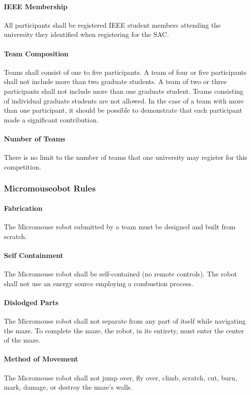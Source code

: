 \documentclass[12pt]{article}
\begin{document}
\paragraph{IEEE Membership}
All participants shall be registered IEEE student members attending the university they
identified when registering for the SAC.
\paragraph{Team Composition}
Teams shall consist of one to five participants. A team of four or five participants shall
not include more than two graduate students. A team of two or three participants shall
not include more than one graduate student. Teams consisting of individual graduate
students are not allowed. In the case of a team with more than one participant, it
should be possible to demonstrate that each participant made a significant contribution.
\paragraph{Number of Teams}
There is no limit to the number of teams that one university may register for this
competition.
\subsubsection{\texorpdfstring{\gls{Micromouse}} Robot Rules}
\paragraph{Fabrication}
The \gls{Micromouse} robot submitted by a team must be designed and built from scratch.
\paragraph{Self Containment}
The \gls{Micromouse} robot shall be self-contained (no remote controls). The robot shall not
use an energy source employing a combustion process.
\paragraph{Dislodged Parts}
The \gls{Micromouse} robot shall not separate from any part of itself while navigating the
\gls{maze}. To complete the \gls{maze}, the robot, in its entirety, must enter the center of the
\gls{maze}.
\paragraph{Method of Movement}
The \gls{Micromouse} robot shall not jump over, fly over, climb, scratch, cut, burn, mark,
damage, or destroy the \gls{maze}'s walls.
\end{document}
